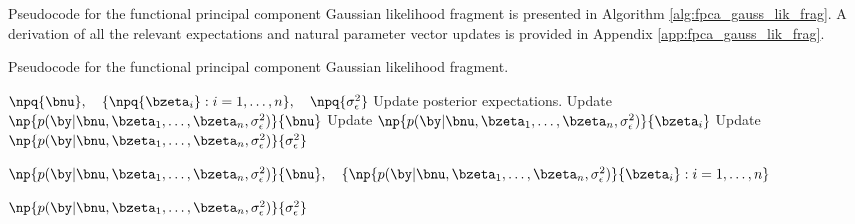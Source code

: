 \documentclass[ba]{imsart}
\numberwithin{equation}{section}
\theoremstyle{plain}
\def\sigsqeps{\sigma^2_{\epsilon}}
\begin{document}


Pseudocode for the functional principal component
Gaussian likelihood fragment is presented in Algorithm \ref{alg:fpca_gauss_lik_frag}.
A derivation of all the relevant expectations and natural parameter vector updates is provided in Appendix
\ref{app:fpca_gauss_lik_frag}.

\begin{algorithm}
	\caption{
		Pseudocode for the functional principal component Gaussian likelihood fragment.
	}
	\label{alg:fpca_gauss_lik_frag}
	\begin{algorithmic}[1]
		\Inputs $
				\npq{\bnu}, \quad
				\{ \npq{\bzeta_i} : i = 1, \dots, n \}, \quad
				\npq{\sigsqeps}
		$
		\Updates
			\State Update posterior expectations.
			\State Update $\np{p (\by | \bnu, \bzeta_1, \dots, \bzeta_n, \sigsqeps)}{\bnu}$
				\State Update $\np{p (\by | \bnu, \bzeta_1, \dots, \bzeta_n, \sigsqeps)}{\bzeta_i}$
			\EndFor
			\State Update $\np{p (\by | \bnu, \bzeta_1, \dots, \bzeta_n, \sigsqeps)}{\sigsqeps}$
		\Outputs
			\begin{varwidth}[t]{\linewidth} $
				\np{p (\by | \bnu, \bzeta_1, \dots, \bzeta_n, \sigsqeps)}{\bnu}, \quad
				\{ \np{p (\by | \bnu, \bzeta_1, \dots, \bzeta_n, \sigsqeps)}{\bzeta_i} : i = 1, \dots, n \}
			$\par$
					\np{p (\by | \bnu, \bzeta_1, \dots, \bzeta_n, \sigsqeps)}{\sigsqeps}
			$ \end{varwidth}
	\end{algorithmic}
\end{algorithm}

\end{document}
